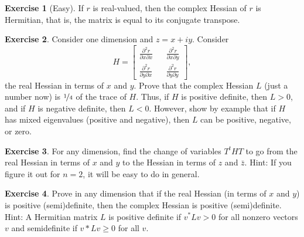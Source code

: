 \documentclass[12pt,openany]{book}
\theoremstyle{plain}
\theoremstyle{remark}
\theoremstyle{definition}
\newenvironment{exbox}{%
    \def\FrameCommand{\vrule width 1pt \relax\hspace{10pt}}%
    \MakeFramed{\advance\hsize-\width\FrameRestore}%
}{%
    \endMakeFramed
}
\theoremstyle{exercise}
\newtheorem{exercise}{Exercise}[section]
\theoremstyle{example}
\begin{document}
\begin{exbox}
\begin{exercise}[Easy]
If $r$ is real-valued, then the complex Hessian of $r$ is Hermitian, that
is, the matrix is equal to its conjugate transpose.
\end{exercise}

\begin{exercise}
Consider one dimension and $z = x+iy$.
Consider
\begin{equation*}
H=\begin{bmatrix}
\frac{\partial^2 r}{\partial x\partial x} &&
\frac{\partial^2 r}{\partial x \partial y}
\\
\frac{\partial^2 r}{\partial y \partial x} &&
\frac{\partial^2 r}{\partial y\partial y}
\end{bmatrix} ,
\end{equation*}
the real Hessian in terms of $x$ and $y$.
Prove that the complex Hessian $L$ (just a number now) is $\nicefrac{1}{4}$
of the trace of $H$.
Thus, if $H$ is positive definite, then $L > 0$, and if $H$ is negative
definite, then $L < 0$.  However, show by example that
if $H$ has mixed eigenvalues (positive
and negative), then $L$ can be positive, negative, or zero.
\end{exercise}

\begin{exercise}
For any dimension,
find the change of variables $T^t H T$ to go from the real Hessian in terms
of $x$ and $y$ to the Hessian in terms of $z$ and $\bar{z}$.
Hint: If you figure it out for $n=2$, it
will be easy to do in general.
\end{exercise}

\begin{exercise}
Prove in any dimension that if the real Hessian (in terms of $x$ and $y$) is
positive (semi)definite, then the complex Hessian is positive (semi)definite.
Hint: A Hermitian matrix $L$ is positive definite if $v^*Lv > 0$ for all
nonzero vectors $v$ and semidefinite if $v*Lv \geq 0$ for all $v$.
\end{exercise}
\end{exbox}
\end{document}
